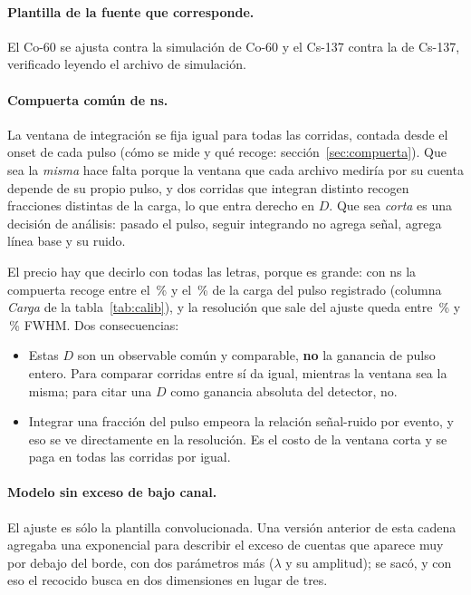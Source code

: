 \documentclass[11pt,a4paper]{article}
\begin{document}
\paragraph{Plantilla de la fuente que corresponde.} El Co-60 se ajusta contra
la simulación de Co-60 y el Cs-137 contra la de Cs-137, verificado leyendo el
archivo de simulación.

\paragraph{Compuerta común de \PostFijo{} ns.} La ventana de integración se
fija igual para todas las corridas, contada desde el onset de cada pulso
(cómo se mide y qué recoge: sección~\ref{sec:compuerta}). Que
sea la \emph{misma} hace falta porque la ventana que cada archivo mediría por
su cuenta depende de su propio pulso, y dos corridas que integran distinto
recogen fracciones distintas de la carga, lo que entra derecho en $D$. Que sea
\emph{corta} es una decisión de análisis: pasado el pulso, seguir integrando no
agrega señal, agrega línea base y su ruido.

El precio hay que decirlo con todas las letras, porque es grande: con
\PostFijo{} ns la compuerta recoge entre el \CargaMin\,\% y el \CargaMax\,\% de
la carga del pulso registrado (columna \emph{Carga} de la
tabla~\ref{tab:calib}), y la resolución que sale del ajuste queda entre
\FwhmMin\,\% y \FwhmMax\,\% FWHM. Dos consecuencias:

\begin{itemize}
\item Estas $D$ son un observable común y comparable, \textbf{no} la ganancia
      de pulso entero. Para comparar corridas entre sí da igual, mientras la
      ventana sea la misma; para citar una $D$ como ganancia absoluta del
      detector, no.
\item Integrar una fracción del pulso empeora la relación señal-ruido por
      evento, y eso se ve directamente en la resolución. Es el costo de la
      ventana corta y se paga en todas las corridas por igual.
\end{itemize}

\paragraph{Modelo sin exceso de bajo canal.} El ajuste es sólo la plantilla
convolucionada. Una versión anterior de esta cadena agregaba una exponencial
para describir el exceso de cuentas que aparece muy por debajo del borde, con
dos parámetros más ($\lambda$ y su amplitud); se sacó, y con eso el recocido
busca en dos dimensiones en lugar de tres.
\end{document}
